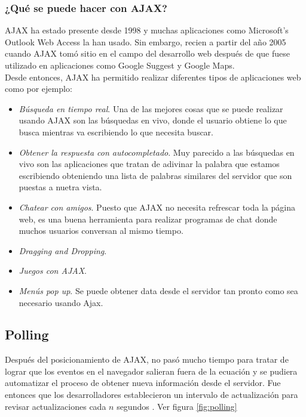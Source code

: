 \subsubsection{¿Qué se puede hacer con AJAX?}

AJAX ha estado presente desde 1998 y muchas aplicaciones como Microsoft's Outlook Web Access la han usado. Sin embargo, recien a partir del año 2005 cuando AJAX tomó sitio en el campo del desarrollo web después de que fuese utilizado en aplicaciones como Google Suggest y Google Maps.\cite{ajax_dummies_2006}\\

Desde entonces, AJAX ha permitido realizar diferentes tipos de aplicaciones web como por ejemplo:

\begin{itemize}
  \item \emph{Búsqueda en tiempo real}. Una de las mejores cosas que se puede realizar usando AJAX son las búsquedas en vivo, donde el usuario obtiene lo que busca mientras va escribiendo lo que necesita buscar.
  \item \emph{Obtener la respuesta con autocompletado}. Muy parecido a las búsquedas en vivo son las aplicaciones que tratan de adivinar la palabra que estamos escribiendo obteniendo una lista de palabras similares del servidor que son puestas a nuetra vista.
  \item \emph{Chatear con amigos}. Puesto que AJAX no necesita refrescar toda la página web, es una buena herramienta para realizar programas de chat donde muchos usuarios conversan al mismo tiempo.
  \item \emph{Dragging and Dropping}.
  \item \emph{Juegos con AJAX}.
  \item \emph{Menús pop up}. Se puede obtener data desde el servidor tan pronto como sea necesario usando Ajax.
\end{itemize}

\subsection{Polling}
Después del posicionamiento de AJAX, no pasó mucho tiempo para tratar de lograr que los eventos en el navegador salieran fuera de la ecuación y se pudiera automatizar el proceso de obtener nueva información desde el servidor. Fue entonces que los desarrolladores establecieron un intervalo de actualización para revisar actualizaciones cada $n$ segundos \cite{lengstorf_realtime_2013}. Ver figura \ref{fig:polling}

